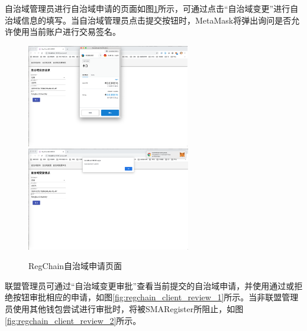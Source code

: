       
      自治域管理员进行自治域申请的页面如图\ref{fig:regchain_client_request}所示，可通过点击“自治域变更”进行自治域信息的填写。当自治域管理员点击提交按钮时，MetaMask将弹出询问是否允许使用当前账户进行交易签名。
      
      \begin{figure}[H]
        \centering
        {\includegraphics[height=4.5cm]{figures/regchain_client_request_1.png}}
        \hspace{1em}
        {\includegraphics[height=4.5cm]{figures/regchain_client_request_2.png}}
        \caption{RegChain自治域申请页面}
        \label{fig:regchain_client_request}
      \end{figure}
      
      联盟管理员可通过“自治域变更审批”查看当前提交的自治域申请，并使用通过或拒绝按钮审批相应的申请，如图\ref{fig:regchain_client_review_1}所示。当非联盟管理员使用其他钱包尝试进行审批时，将被SMARegister所阻止，如图\ref{fig:regchain_client_review_2}所示。

